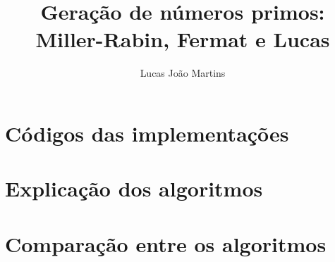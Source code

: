 \documentclass[12pt]{article}
\title{
  Geração de números primos: \\
  \large Miller-Rabin, Fermat e Lucas}
\author{Lucas João Martins}
\date{}
\begin{document}
\maketitle

\section{Códigos das implementações}




\section{Explicação dos algoritmos}

\section{Comparação entre os algoritmos}
\end{document}
